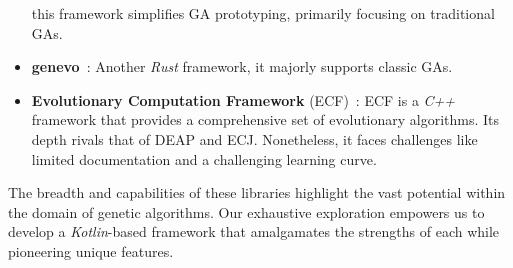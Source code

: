 \begin{itemize}
      this framework simplifies GA prototyping, primarily focusing on 
      traditional GAs.
    \item \textbf{genevo}~\autocite{GenevoRust}: Another \textit{Rust} 
      framework, it majorly supports classic GAs.
    \item \textbf{Evolutionary Computation Framework} 
      (ECF)~\autocite{djakobovicECFEvolutionaryComputation2023}: ECF is a 
      \textit{C++} framework that provides a comprehensive set of evolutionary 
      algorithms.
      Its depth rivals that of DEAP and ECJ.
      Nonetheless, it faces challenges like limited documentation and a 
      challenging learning curve.
  \end{itemize}

  The breadth and capabilities of these libraries highlight the vast potential 
  within the domain of genetic algorithms.
  Our exhaustive exploration empowers us to develop a \textit{Kotlin}-based 
  framework that amalgamates the strengths of each while pioneering unique 
  features.
